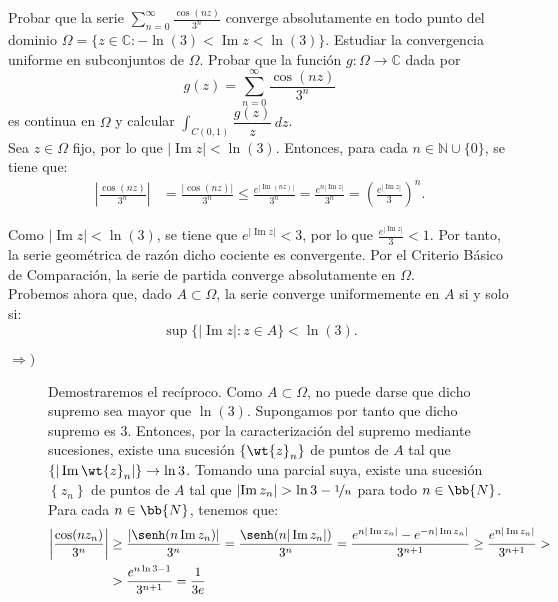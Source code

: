 \documentclass[12pt]{article}
\renewcommand{\Im}{\operatorname{Im}}
\begin{document}
    \newpage
    \setcounter{ejercicio}{0}

    \begin{ejercicio}[4 puntos]
        Probar que la serie $\displaystyle \sum_{n=0}^{\infty} \frac{\cos(nz)}{3^n}$ converge absolutamente en todo punto del dominio $\Omega = \{ z \in \mathbb{C} : -\ln(3) < \Im z < \ln(3) \}$. Estudiar la convergencia uniforme en subconjuntos de $\Omega$. Probar que la función $g : \Omega \to \mathbb{C}$ dada por
        \[
            g(z) = \sum_{n=0}^{\infty} \frac{\cos(nz)}{3^n}
        \]
        es continua en $\Omega$ y calcular $\displaystyle \int_{C(0,1)} \dfrac{g(z)}{z} \, dz$.\\

        Sea $z\in \Omega$ fijo, por lo que $|\Im z| < \ln(3)$. Entonces, para cada $n\in \mathbb{N}\cup \{0\}$, se tiene que:
        \begin{align*}
            \left| \frac{\cos(nz)}{3^n} \right| &= \frac{|\cos(nz)|}{3^n} \leq \frac{e^{|\Im(nz)|}}{3^n} = \frac{e^{n|\Im z|}}{3^n} = \left( \frac{e^{|\Im z|}}{3} \right)^n.
        \end{align*}

        Como $|\Im z| < \ln(3)$, se tiene que $e^{|\Im z|} < 3$, por lo que $\frac{e^{|\Im z|}}{3} < 1$. Por tanto, la serie geométrica de razón dicho cociente es convergente. Por el Criterio Básico de Comparación, la serie de partida converge absolutamente en $\Omega$.\\

        Probemos ahora que, dado $A\subset \Omega$, la serie converge uniformemente en $A$ si y solo si:
        \[
            \sup\{|\Im z| : z\in A\} < \ln(3).
        \]
        \begin{description}
            \item[$\Longrightarrow)$] Demostraremos el recíproco. Como $A\subset \Omega$, no puede darse que dicho supremo sea mayor que $\ln(3)$. Supongamos por tanto que dicho supremo es $3$. Entonces, por la caracterización del supremo mediante sucesiones, existe una sucesión $\left\{\wt{z}_n\right\}$ de puntos de $A$ tal que $\left\{|\Im \wt{z}_n|\right\}\to \ln 3$. Tomando una parcial suya, existe una sucesión $\left\{z_n\right\}$ de puntos de $A$ tal que $\left|\Im z_n\right|>\ln 3 - \nicefrac{1}{n}$ para todo $n\in \bb{N}$.\\
            
            Para cada $n\in \bb{N}$, tenemos que:
            \begin{align*}
                \left|\dfrac{\cos(nz_n)}{3^n}\right| &\geq \dfrac{\left|\senh(n\Im z_n)\right|}{3^{n}}
                = \dfrac{\senh(n|\Im z_n|)}{3^{n}}
                = \dfrac{e^{n|\Im z_n|}-e^{-n|\Im z_n|}}{3^{n+1}} \geq \dfrac{e^{n|\Im z_n|}}{3^{n+1}}
                > \\
                &> \dfrac{e^{n\ln 3 -1}}{3^{n+1}}
                = \dfrac{1}{3e}
            \end{align*}


\end{description}
\end{ejercicio}
\end{document}
